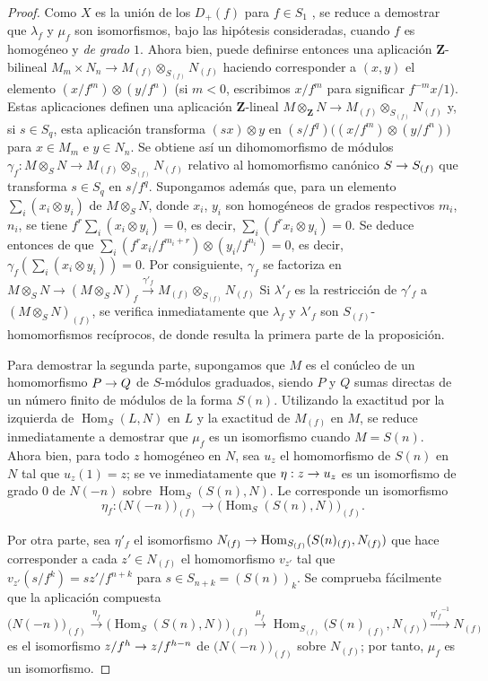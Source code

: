 \documentclass[oneside,10pt]{amsart}
\makeatletter
\newcommand{\ega@arrow}[2]{\mathchoice{#1}{#2}{#2}{#2}}
\renewcommand{\to}{\ega@arrow{\longrightarrow}{\rightarrow}}
\newcommand{\oldpage}[2][]{\marginnote{\normalfont\footnotesize\textbf{#1}~|~#2}\ignorespaces}
\makeatother
\begin{document}
\begin{proof}
Como $X$ es la unión de los $D_+(f)$ para $f\in S_1$ , se reduce a demostrar que $\lambda_f$ y $\mu_f$ son isomorfismos, bajo las hipótesis consideradas, cuando $f$ es homogéneo y \emph{de grado $1$}.
Ahora bien, puede definirse entonces una aplicación $\mathbf{Z}$-bilineal $M_m\times N_n\longrightarrow M_{(f)}\otimes_{S_{(f)}}N_{(f)}$ haciendo corresponder a $(x,y)$ el elemento $(x/f^m)\otimes(y/f^n)$ (si $m<0$, escribimos $x/f^m$ para significar $f^{-m}x/1$).
Estas aplicaciones definen una aplicación $\mathbf{Z}$-lineal $M\otimes_{\mathbf{Z}}N\longrightarrow M_{(f)}\otimes_{S_{(f)}}N_{(f)}$ y, si $s\in S_q$, esta aplicación transforma $(sx)\otimes y$ en
$(s/f^q)\bigl((x/f^m)\otimes(y/f^n)\bigr)$
para $x\in M_m$ e $y\in N_n$.
Se obtiene así un dihomomorfismo de módulos
$\gamma_f:M\otimes_S N\longrightarrow M_{(f)}\otimes_{S_{(f)}}N_{(f)}$
relativo al homomorfismo canónico $S\to S_{(f)}$ que transforma $s\in S_q$ en $s/f^q$.
Supongamos además que, para un elemento $\sum_i(x_i\otimes y_i)$ de $M\otimes_S N$, donde $x_i$, $y_i$ son homogéneos de grados respectivos $m_i$, $n_i$, se tiene
$f^r\sum_i(x_i\otimes y_i)=0$,
es decir, $\sum_i(f^rx_i\otimes y_i)=0$.
Se deduce entonces de  que
$\sum_i(f^rx_i/f^{m_i+r})\otimes(y_i/f^{n_i})=0$,
es decir, $\gamma_f(\sum_i(x_i\otimes y_i))=0$.
Por consiguiente, $\gamma_f$ se factoriza en
$M\otimes_S N\longrightarrow(M\otimes_S N)_f\xrightarrow{\gamma'_f}M_{(f)}\otimes_{S_{(f)}}N_{(f)}$
Si $\lambda'_f$ es la restricción de $\gamma'_f$
\oldpage[II]{35}
a $(M\otimes_S N)_{(f)}$, se verifica inmediatamente que $\lambda_f$ y $\lambda'_f$ son $S_{(f)}$-homomorfismos recíprocos, de donde resulta la primera parte de la proposición.

Para demostrar la segunda parte, supongamos que $M$ es el conúcleo de un homomorfismo $P\to Q$ de $S$-módulos graduados, siendo $P$ y $Q$ sumas directas de un número finito de módulos de la forma $S(n)$.
Utilizando la exactitud por la izquierda de $\operatorname{Hom}_S(L,N)$ en $L$ y la exactitud de $M_{(f)}$ en $M$, se reduce inmediatamente a demostrar que $\mu_f$ es un isomorfismo cuando $M=S(n)$.
Ahora bien, para todo $z$ homogéneo en $N$, sea $u_z$ el homomorfismo de $S(n)$ en $N$ tal que $u_z(1)=z$; se ve inmediatamente que $\eta:z\to u_z$ es un isomorfismo de grado $0$ de $N(-n)$ sobre $\operatorname{Hom}_S(S(n),N)$.
Le corresponde un isomorfismo
\[
  \eta_f:\bigl(N(-n)\bigr)_{(f)}
  \longrightarrow
  \bigl(\operatorname{Hom}_S(S(n),N)\bigr)_{(f)}.
\]

Por otra parte, sea $\eta'_f$ el isomorfismo $N_{(f)}\to\operatorname{Hom}_{S_{(f)}}(S(n)_{(f)},N_{(f)})$ que hace corresponder a cada $z'\in N_{(f)}$ el homomorfismo $v_{z'}$ tal que
$v_{z'}(s/f^k)=sz'/f^{n+k}$
para $s\in S_{n+k}=(S(n))_k$.
Se comprueba fácilmente que la aplicación compuesta
\[
  \bigl(N(-n)\bigr)_{(f)}
  \xrightarrow{\eta_f}
  \bigl(\operatorname{Hom}_S(S(n),N)\bigr)_{(f)}
  \xrightarrow{\mu_f}
  \operatorname{Hom}_{S_{(f)}}\bigl(S(n)_{(f)},N_{(f)}\bigr)
  \xrightarrow{{\eta'_f}^{-1}}N_{(f)}
\]
es el isomorfismo $z/f^h\to z/f^{h-n}$ de $\bigl(N(-n)\bigr)_{(f)}$ sobre $N_{(f)}$; por tanto, $\mu_f$ es un isomorfismo.
\end{proof}
\end{document}
